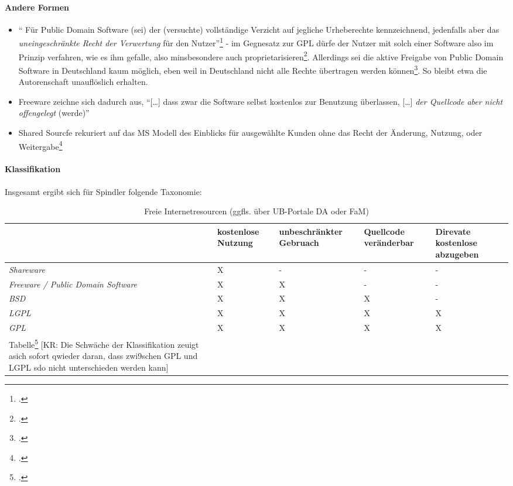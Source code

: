 \documentclass[DIV=calc,BCOR=5mm,11pt,headings=small,oneside,abstract=true, toc=bib]{scrartcl}
\begin{document}
\paragraph{Andere Formen}

\begin{itemize}
  \item \enquote{ Für Public Domain Software (sei) der (versuchte) vollständige
  Verzicht auf jegliche Urheberechte kennzeichnend, jedenfalls aber das
  \emph{uneingeschränkte Recht der Verwertung} für den
  Nutzer}\footcite[][17]{Spindler2004a} - im Gegnesatz zur GPL dürfe der
  Nutzer mit solch einer Software also im Prinzip verfahren, wie es ihm gefalle,
  also minsbesondere auch proprietarisieren\footcite[][17]{Spindler2004a}.
  Allerdings sei die aktive Freigabe von Public Domain Software in Deutschland
  kaum möglich, eben weil in Deutschland nicht alle Rechte übertragen werden
  können\footcite[][17]{Spindler2004a}. So bleibt etwa die Autorenschaft
  unauflöslich erhalten.
  \item Freeware zeichne sich dadurch aus, \enquote{[\ldots] dass zwar die
  Software selbst kostenlos zur Benutzung überlassen, [\ldots] \emph{der
  Quellcode aber nicht offengelegt} (werde)}
  \item Shared Sourcfe rekuriert auf das MS Modell des Einblicks für ausgewählte
  Kunden ohne das Recht der Änderung, Nutzung, oder
  Weitergabe\footcite[][18]{Spindler2004a}
\end{itemize}

\paragraph{Klassifikation}
Insgesamt ergibt sich für Spindler folgende Taxonomie:

\begin{table}
\footnotesize
\caption{Freie Internetresourcen (ggfls. über UB-Portale DA oder FaM)}
\begin{center}
\begin{tabular}[h]{|p{4cm}|p{2cm}|p{2cm}|p{2cm}|p{2cm}|}
\hline
& kostenlose Nutzung
& unbeschränkter Gebruach
& Quellcode veränderbar
& Direvate kostenlose abzugeben
\\
\hline \hline 
\emph{Shareware} & X & - & - & -\\
\hline
\emph{Freeware / Public Domain Software} & X & X & - & -\\
\hline
\emph{BSD} & X & X & X & -\\
\hline
\emph{LGPL} & X & X & X & X\\
\hline
\emph{GPL} & X & X & X & X\\
\hline

Tabelle\footcite[vgl.][19]{Spindler2004a}
[KR: Die Schwäche der Klassifikation zeuigt asich sofort qwieder daran, dass
zwi9schen GPL und LGPL sdo nicht unterschieden werden kann]
\end{tabular}
\end{center}
\end{table}
\end{document}
